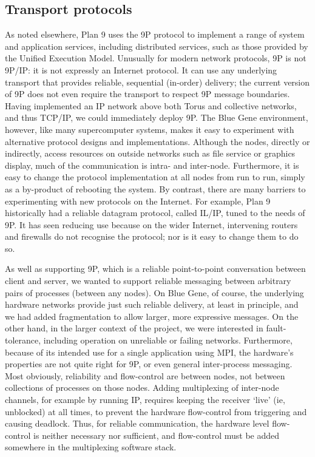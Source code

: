 \subsection{Transport protocols}

As noted elsewhere, Plan 9 uses the 9P protocol to implement a range of system and application services, including distributed services, such as those provided by the Unified Execution Model.
Unusually for modern network protocols, 9P is not 9P/IP: it is not expressly an Internet protocol.
It can use any underlying transport that provides reliable, sequential (in-order) delivery; the current version of 9P does not even require the transport to respect 9P message boundaries.
Having implemented an IP network above both Torus and collective networks, and thus TCP/IP, we could immediately deploy 9P.
The Blue Gene environment, however, like many supercomputer systems, makes it easy to experiment with alternative protocol designs and implementations.
Although the nodes, directly or indirectly, access resources on outside networks such as file service or graphics display, much of the communication is intra- and inter-node.
Furthermore, it is easy to change the protocol implementation at all nodes from run to run, simply as a by-product of rebooting the system.
By contrast, there are many barriers to experimenting with new protocols on the Internet.
For example, Plan 9 historically had a reliable datagram protocol, called IL/IP, tuned to the needs of 9P.
It has seen reducing use because on the wider Internet, intervening routers and firewalls do not recognise the protocol; nor is it easy to change them to do so.

As well as supporting 9P, which is a reliable point-to-point conversation between client and server,
we wanted to support reliable messaging between arbitrary pairs of processes (between any nodes).
On Blue Gene, of course, the underlying hardware networks provide just such reliable delivery, at least in principle, and we had added fragmentation to allow larger, more expressive messages.
On the other hand, in the larger context of the project, we were interested in fault-tolerance, including operation on unreliable or failing networks.
Furthermore, because of its intended use for a single application using MPI, the hardware's properties are not quite right for 9P, or even general inter-process messaging.
Most obviously, reliability and flow-control are between nodes, not between collections of processes on those nodes.
Adding multiplexing of inter-node channels, for example by running IP, requires keeping the receiver `live' (ie, unblocked) at all times, to prevent the hardware flow-control from triggering and causing deadlock. Thus, for reliable communication, the hardware level flow-control is neither necessary nor sufficient, and flow-control must be added somewhere in the multiplexing software stack.

